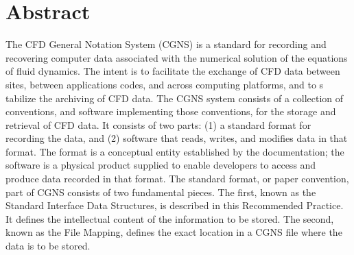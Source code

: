 \hypertarget{abstract}{}
\section*{Abstract}
\thispagestyle{plain}

The CFD General Notation System (CGNS) is a standard for recording and recovering computer
data associated with the numerical solution of the equations of fluid dynamics. The intent is to
facilitate the exchange of CFD data between sites, between applications codes, and across
computing platforms, and to s tabilize the archiving of CFD data.
The CGNS system consists of a collection of conventions, and software implementing those
conventions, for the storage and retrieval of CFD data. It consists of two parts: (1) a standard
format for recording the data, and (2) software that reads, writes, and modifies data in that format.
The format is a conceptual entity established by the documentation; the software is a physical
product supplied to enable developers to access and produce data recorded in that format.
The standard format, or paper convention, part of CGNS consists of two fundamental pieces. The
first, known as the Standard Interface Data Structures, is described in this Recommended
Practice. It defines the intellectual content of the information to be stored. The second, known as
the File Mapping, defines the exact location in a CGNS file where the data is to be stored.

